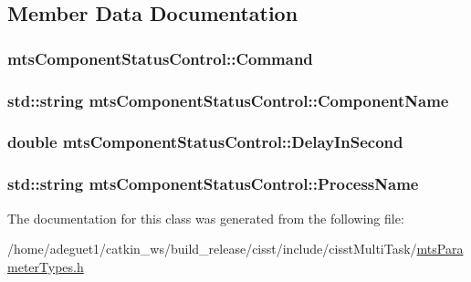 \subsection{Member Data Documentation}
\hypertarget{classmts_component_status_control_a689d4823e12fbae1ca81e3de0b246c40}{
\subsubsection[{Command}]{ mts\-Component\-Status\-Control\-::\-Command}}\label{classmts_component_status_control_a689d4823e12fbae1ca81e3de0b246c40}
\hypertarget{classmts_component_status_control_a10e6f2dd9746957babad7a0ca081bf9c}{
\subsubsection[{Component\-Name}]{\setlength{\rightskip}{0pt plus 5cm}std\-::string mts\-Component\-Status\-Control\-::\-Component\-Name}}\label{classmts_component_status_control_a10e6f2dd9746957babad7a0ca081bf9c}
\hypertarget{classmts_component_status_control_a91669bce299eebde1907da850c138c01}{
\subsubsection[{Delay\-In\-Second}]{\setlength{\rightskip}{0pt plus 5cm}double mts\-Component\-Status\-Control\-::\-Delay\-In\-Second}}\label{classmts_component_status_control_a91669bce299eebde1907da850c138c01}
\hypertarget{classmts_component_status_control_af79c985b9f9820b1a8faabf58a0abf47}{
\subsubsection[{Process\-Name}]{\setlength{\rightskip}{0pt plus 5cm}std\-::string mts\-Component\-Status\-Control\-::\-Process\-Name}}\label{classmts_component_status_control_af79c985b9f9820b1a8faabf58a0abf47}


The documentation for this class was generated from the following file\-:\begin{DoxyCompactItemize}
\item 
/home/adeguet1/catkin\-\_\-ws/build\-\_\-release/cisst/include/cisst\-Multi\-Task/\hyperlink{mts_parameter_types_8h}{mts\-Parameter\-Types.\-h}\end{DoxyCompactItemize}
